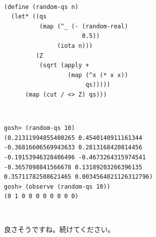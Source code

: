 \hline
\begin{minipage}{.01\hsize}
  ~
\end{minipage}
\begin{minipage}{.39\hsize}
  \begin{verbatim}
(define (random-qs n)
  (let* ((qs
          (map (^_ (- (random-real)
                      0.5))
               (iota n)))
         (Z
          (sqrt (apply +
                  (map (^x (* x x))
                       qs)))))
      (map (cut / <> Z) qs)))
  \end{verbatim}
\end{minipage}
\begin{minipage}{.10\hsize}
  ~
\end{minipage}
\begin{minipage}{.39\hsize}
  \begin{verbatim}
gosh> (random-qs 10)
(0.21311994855400265 0.4540140911161344
-0.36816606569943633 0.2813168420814456
-0.19153946328486496 -0.4673264315974541
-0.3657098841566678 0.13189203266396135
0.35711782508621465 0.0034564021126312796)
gosh> (observe (random-qs 10))
(0 1 0 0 0 0 0 0 0 0)
  \end{verbatim}
\end{minipage}



\hline
\begin{minipage}{.01\hsize}
  ~
\end{minipage}
\begin{minipage}{.39\hsize}
  良さそうですね。続けてください。
\end{minipage}
\begin{minipage}{.10\hsize}
  ~
\end{minipage}
\begin{minipage}{.39\hsize}
\end{minipage}

